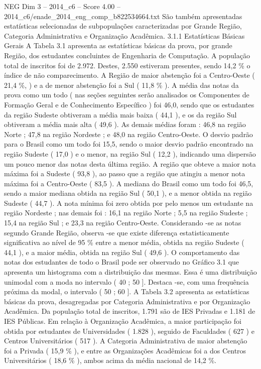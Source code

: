 \begin{textsample}{NEG Dim 3 – 2014\_c6 – Score 4.00 – 2014\_c6/enade\_2014\_eng\_comp\_b822534664.txt}
São também apresentadas estatísticas selecionadas de subpopulações caracterizadas por Grande Região, Categoria Administrativa e Organização Acadêmica. 3.1.1 Estatísticas Básicas Gerais A Tabela 3.1 apresenta as estatísticas básicas da prova, por grande Região, dos estudantes concluintes de Engenharia de Computação.
A população total de inscritos foi de 2.972.
Destes, 2.550 estiveram presentes, sendo 14,2 \% o índice de não comparecimento.
A Região de maior abstenção foi a Centro-Oeste ( 21,4 \%, ) e a de menor abstenção foi a Sul ( 11,8 \% ).
A média das notas da prova como um todo ( nas seções seguintes serão analisados os Componentes de Formação Geral e de Conhecimento Específico ) foi 46,0, sendo que os estudantes da região Sudeste obtiveram a média mais baixa ( 44,1 ), e os da região Sul obtiveram a média mais alta ( 49,6 ).
As demais médias foram : 46,8 na região Norte ; 47,8 na região Nordeste ; e 48,0 na região Centro-Oeste.
O desvio padrão para o Brasil como um todo foi 15,5, sendo o maior desvio padrão encontrado na região Sudeste ( 17,0 ) e o menor, na região Sul ( 12,2 ), indicando uma dispersão um pouco menor das notas desta última região.
A região que obteve a maior nota máxima foi a Sudeste ( 93,8 ), ao passo que a região que atingiu a menor nota máxima foi a Centro-Oeste ( 83,5 ).
A mediana do Brasil como um todo foi 46,5, sendo a maior mediana obtida na região Sul ( 50,1 ), e a menor obtida na região Sudeste ( 44,7 ).
A nota mínima foi zero obtida por pelo menos um estudante na região Nordeste ; nas demais foi : 16,1 na região Norte ; 5,5 na região Sudeste ; 15,4 na região Sul ; e 23,3 na região Centro-Oeste.
Considerando -se as notas segundo Grande Região, observa -se que existe diferença estatisticamente significativa ao nível de 95 \% entre a menor média, obtida na região Sudeste ( 44,1 ), e a maior média, obtida na região Sul ( 49,6 ).
O comportamento das notas dos estudantes de todo o Brasil pode ser observado no Gráfico 3.1 que apresenta um histograma com a distribuição das mesmas.
Essa é uma distribuição unimodal com a moda no intervalo ( 40 ; 50 ].
Destaca -se, com uma frequência próxima da modal, o intervalo ( 50 ; 60 ].
A Tabela 3.2 apresenta as estatísticas básicas da prova, desagregadas por Categoria Administrativa e por Organização Acadêmica.
Da população total de inscritos, 1.791 são de IES Privadas e 1.181 de IES Públicas.
Em relação à Organização Acadêmica, a maior participação foi obtida por estudantes de Universidades ( 1.828 ), seguido de Faculdades ( 627 ) e Centros Universitários ( 517 ).
A Categoria Administrativa de maior abstenção foi a Privada ( 15,9 \% ), e entre as Organizações Acadêmicas foi a dos Centros Universitários ( 18,6 \% ), ambos acima da média nacional de 14,2 \%.

\end{textsample}
